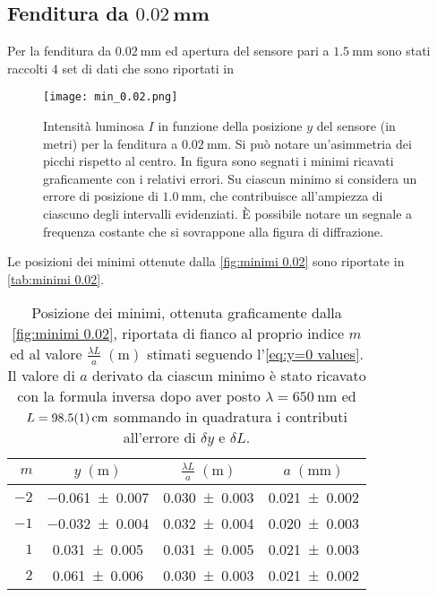 \documentclass[../main.tex]{subfiles}
\begin{document}
\subsection{Fenditura da $\mathbf{\qty{0.02}{\mm}}$}

Per la fenditura da $\qty{0.02}{\mm}$ ed apertura del sensore pari a $\qty{1.5}{\mm}$ sono stati raccolti $4$ set di dati che sono riportati in %

\begin{figure}[ht!]
    \centering
    \texttt{[image: min\_0.02.png]}
    \caption{Intensità luminosa $I$ in funzione della posizione $y$ del sensore (in metri) per la fenditura a $\qty{0.02}{\milli\metre}$. Si può notare un'asimmetria dei picchi  rispetto al centro. In figura sono segnati i minimi ricavati graficamente con i relativi errori. Su ciascun minimo si considera un errore di posizione di $\qty{1.0}{\mm}$, che contribuisce all'ampiezza di ciascuno degli intervalli evidenziati. È possibile notare un segnale a frequenza costante che si sovrappone alla figura di diffrazione.} %
    \label{fig:minimi 0.02}
\end{figure}

Le posizioni dei minimi ottenute dalla \autoref{fig:minimi 0.02} sono riportate in \autoref{tab:minimi 0.02}.

\begin{table}[ht!]
    \centering
    \caption{Posizione dei minimi, ottenuta graficamente dalla \autoref{fig:minimi 0.02}, riportata di fianco al proprio indice $m$ ed al valore $\frac{\lambda L}{a} \; (\si{\metre})$ stimati seguendo l'\autoref{eq:y=0 values}. Il valore di $a$ derivato da ciascun minimo è stato ricavato con la formula inversa dopo aver posto $\lambda = \qty{650}{\nm}$ ed $L = \qty{98.5+-0.1}{\cm}$ sommando in quadratura i contributi all'errore di $\delta y$ e $\delta L$.}
    \begin{tabular}{r|cc|c}
        \toprule
        $m$  & $y \; (\si{\metre})$ & $\frac{\lambda L}{a} \; (\si{\metre})$ & $a \; (\si{\mm})$  \\
        \midrule
        $-2$ & \num{-0.061+-0.007}  & \num{0.030+-0.003}                     & \num{0.021+-0.002} \\
        $-1$ & \num{-0.032+-0.004}  & \num{0.032+-0.004}                     & \num{0.020+-0.003} \\
        $1$  & \num{0.031+-0.005}   & \num{0.031+-0.005}                     & \num{0.021+-0.003} \\
        $2$  & \num{0.061+-0.006}   & \num{0.030+-0.003}                     & \num{0.021+-0.002} \\
        \bottomrule
    \end{tabular}
    \label{tab:minimi 0.02}
\end{table}
\end{document}
